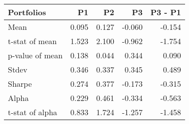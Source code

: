 \begin{tabular}{lrrrr}
\toprule
Portfolios & P1 & P2 & P3 & P3 - P1 \\
\midrule
Mean & 0.095 & 0.127 & -0.060 & -0.154 \\
t-stat of mean & 1.523 & 2.100 & -0.962 & -1.754 \\
p-value of mean & 0.138 & 0.044 & 0.344 & 0.090 \\
Stdev & 0.346 & 0.337 & 0.345 & 0.489 \\
Sharpe & 0.274 & 0.377 & -0.173 & -0.315 \\
Alpha & 0.229 & 0.461 & -0.334 & -0.563 \\
t-stat of alpha & 0.833 & 1.724 & -1.257 & -1.458 \\
\bottomrule
\end{tabular}
